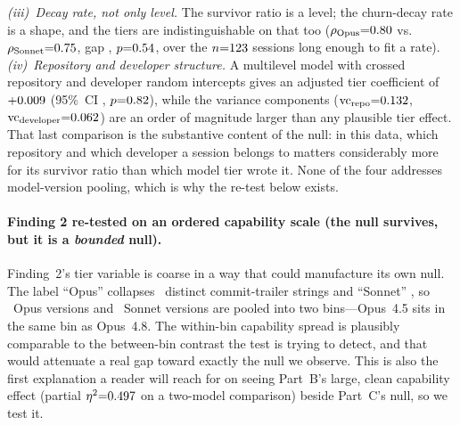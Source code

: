 \emph{(iii)~Decay rate, not only level.} The survivor ratio is a level; the churn-decay rate is a shape, and the tiers are indistinguishable on that too ($\rho_{\mathrm{Opus}}{=}0.80$ vs.\ $\rho_{\mathrm{Sonnet}}{=}0.75$, gap \statPCChurnGap, $p{=}0.54$, over the $n{=}123$ sessions long enough to fit a rate). \emph{(iv)~Repository and developer structure.} A multilevel model with crossed repository and developer random intercepts gives an adjusted tier coefficient of ${+}0.009$ (95\%~CI \statPCMultilevelCI, $p{=}0.82$), while the variance components ($\text{vc}_{\mathrm{repo}}{=}0.132$, $\text{vc}_{\mathrm{developer}}{=}0.062$) are an order of magnitude larger than any plausible tier effect. That last comparison is the substantive content of the null: in this data, which repository and which developer a session belongs to matters considerably more for its survivor ratio than which model tier wrote it. None of the four addresses model-version pooling, which is why the re-test below exists.

\paragraph{Finding 2 re-tested on an ordered capability scale (the null survives, but it is a \emph{bounded} null).} Finding~2's tier variable is coarse in a way that could manufacture its own null. The label ``Opus'' collapses \statPCOpusTrailers\ distinct commit-trailer strings and ``Sonnet'' \statPCSonnetTrailers, so \statPCOpusVersions\ Opus versions and \statPCSonnetVersions\ Sonnet versions are pooled into two bins---Opus~4.5 sits in the same bin as Opus~4.8. The within-bin capability spread is plausibly comparable to the between-bin contrast the test is trying to detect, and that would attenuate a real gap toward exactly the null we observe. This is also the first explanation a reader will reach for on seeing Part~B's large, clean capability effect (partial $\eta^2{=}0.497$ on a two-model comparison) beside Part~C's null, so we test it.

